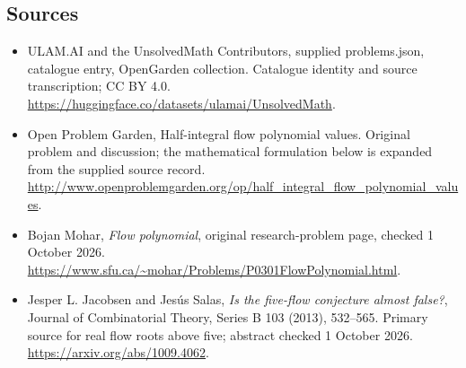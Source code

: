 \documentclass[11pt,a4paper]{article}
\begin{document}
\subsection{Sources}
\begin{itemize}
\item[S1] ULAM.AI and the UnsolvedMath Contributors, supplied problems.json, catalogue entry, OpenGarden collection. Catalogue identity and source transcription; CC BY 4.0.
\url{https://huggingface.co/datasets/ulamai/UnsolvedMath}.
\item[S2] Open Problem Garden, Half-integral flow polynomial values. Original problem and discussion; the mathematical formulation below is expanded from the supplied source record.
\url{http://www.openproblemgarden.org/op/half_integral_flow_polynomial_values}.

\item[R1] Bojan Mohar, \emph{Flow polynomial}, original research-problem
page, checked 1 October 2026.
\url{https://www.sfu.ca/~mohar/Problems/P0301FlowPolynomial.html}.
\item[R2] Jesper L. Jacobsen and Jes\'us Salas,
\emph{Is the five-flow conjecture almost false?}, Journal of
Combinatorial Theory, Series B 103 (2013), 532--565. Primary source
for real flow roots above five; abstract checked 1 October 2026.
\url{https://arxiv.org/abs/1009.4062}.

\end{itemize}
\end{document}
